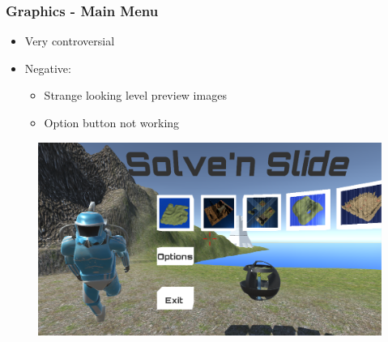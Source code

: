 \documentclass[xcolor=dvipsnames]{beamer}
\begin{document}
	\begin{frame}
		\frametitle{Graphics - Main Menu}
		\begin{itemize}
			\item Very controversial
			\item Negative:
			\begin{itemize}
				\item Strange looking level preview images
				\item Option button not working
			\end{itemize}
		\end{itemize}
		\begin{figure}[H]
			\centering
			\includegraphics[scale=0.2]{images/playtesting/mainMenu}
		\end{figure}
	\end{frame}
	
\end{document}
